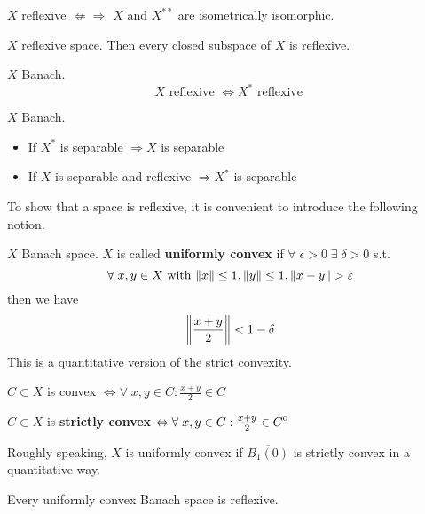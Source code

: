 \begin{remark}
    \(X\) reflexive \({\displaystyle\nLeftarrow}{\Rightarrow}\) \(X\) and \(X^{**}\) are isometrically isomorphic.
\end{remark}
\begin{theorem}
    \(X\) reflexive space. Then every closed subspace of \(X\) is reflexive.
\end{theorem}
\begin{theorem}
    \(X\) Banach. 
    \[
        X \mbox{ reflexive } \Leftrightarrow X^* \mbox{ reflexive }
    \]
\end{theorem}
\begin{theorem}
    \(X\) Banach.
    \begin{itemize}
        \item If \(X^*\) is separable \(\Rightarrow X\) is separable
        \item If \(X\) is separable and reflexive \(\Rightarrow X^*\) is separable
    \end{itemize}
\end{theorem}
To show that a space is reflexive, it is convenient to introduce the following notion.
\begin{definition}
    \(X\) Banach space. \(X\) is called \textbf{uniformly convex} if \(\forall \; \epsilon > 0 \; \exists \; \delta > 0 \) s.t. 
    \[
        \forall \; x, y \in X \mbox{ with } \norm{x} \leq 1, \norm{y} \leq 1, \norm{x-y} > \varepsilon
    \]
    then we have 
    \[
        \norm{\frac{x+y}{2}} < 1-\delta
    \]
    This is a quantitative version of the strict convexity.
\end{definition}
\begin{definition}
    \(C \subset X\) is convex  \(\Leftrightarrow \forall \; x,y \in C : \frac{x+y}{2} \in C\)

    \noindent \(C \subset X\) is \textbf{strictly convex} \(\Leftrightarrow \forall \; x,y \in C : \frac{x+y}{2} \in {\kern0ptC}^{\mathrm{o}}\)
\end{definition}
Roughly speaking, \(X\) is uniformly convex if \(\overline{B_1(0)}\) is strictly convex in a quantitative way.
\begin{theorem}
    Every uniformly convex Banach space is reflexive.
\end{theorem}